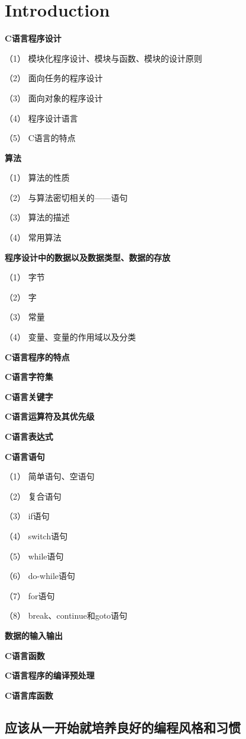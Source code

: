 \part{Introduction}

\textbf{C语言程序设计}

（1） 模块化程序设计、模块与函数、模块的设计原则

（2） 面向任务的程序设计

（3） 面向对象的程序设计

（4） 程序设计语言

（5） C语言的特点

\textbf{算法}

（1） 算法的性质

（2） 与算法密切相关的——语句

（3） 算法的描述

（4） 常用算法

\textbf{程序设计中的数据以及数据类型、数据的存放}

（1） 字节

（2） 字

（3） 常量

（4） 变量、变量的作用域以及分类

\textbf{C语言程序的特点}

\textbf{C语言字符集}

\textbf{C语言关键字}

\textbf{C语言运算符及其优先级}

\textbf{C语言表达式}

\textbf{C语言语句}

（1） 简单语句、空语句

（2） 复合语句

（3） if语句

（4） switch语句

（5） while语句

（6） do-while语句

（7） for语句

（8） break、continue和goto语句

\textbf{数据的输入输出}

\textbf{C语言函数}

\textbf{C语言程序的编译预处理}

\textbf{C语言库函数}


\chapter{应该从一开始就培养良好的编程风格和习惯}


